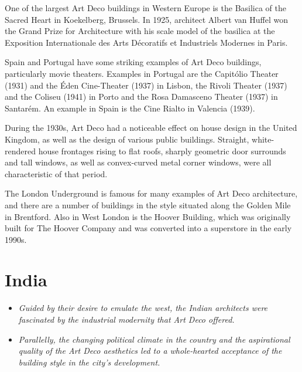 One of the largest Art Deco buildings in Western Europe is the Basilica
of the Sacred Heart in Koekelberg, Brussels. In 1925, architect Albert
van Huffel won the Grand Prize for Architecture with his scale model of
the basilica at the Exposition Internationale des Arts Décoratifs et
Industriels Modernes in Paris.

Spain and Portugal have some striking examples of Art Deco buildings,
particularly movie theaters. Examples in Portugal are the Capitólio
Theater (1931) and the Éden Cine-Theater (1937) in Lisbon, the Rivoli
Theater (1937) and the Coliseu (1941) in Porto and the Rosa Damasceno
Theater (1937) in Santarém. An example in Spain is the Cine Rialto in
Valencia (1939).

During the 1930s, Art Deco had a noticeable effect on house design in
the United Kingdom, as well as the design of various public buildings.
Straight, white-rendered house frontages rising to flat roofs, sharply
geometric door surrounds and tall windows, as well as convex-curved
metal corner windows, were all characteristic of that period.

The London Underground is famous for many examples of Art Deco
architecture, and there are a number of buildings in the style situated
along the Golden Mile in Brentford. Also in West London is the Hoover
Building, which was originally built for The Hoover Company and was
converted into a superstore in the early 1990s.

\section{India}\label{india}

\begin{itemize}
\item
  \emph{Guided by their desire to emulate the west, the Indian
  architects were fascinated by the industrial modernity that Art Deco
  offered.}
\item
  \emph{Parallelly, the changing political climate in the country and
  the aspirational quality of the Art Deco aesthetics led to a
  whole-hearted acceptance of the building style in the city's
  development.}
\end{itemize}

